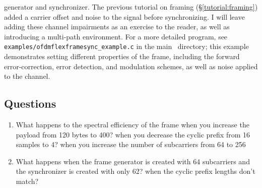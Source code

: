 generator and synchronizer.
The previous tutorial on framing (\S\ref{tutorial:framing}) added
a carrier offset and noise to the signal before synchronizing.
I will leave adding these channel impairments as an exercise to the
reader, as well as introducing a multi-path environment.
%
For a more detailed program, see {\tt examples/ofdmflexframesync\_example.c}
in the main \liquid\ directory;
this example demonstrates setting different properties of the frame,
including the forward error-correction, error detection, and modulation
schemes,
as well as noise applied to the channel.
%
%

%
%

%
%
\subsection{Questions}
\label{tutorial:ofdmflexframe:questions}

\begin{enumerate}
\item What happens to the spectral efficiency of the frame when you
      increase the payload from 120 bytes to 400?
      when you decrease the cyclic prefix from 16 samples to 4?
      when you increase the number of subcarriers from 64 to 256
\item What happens when the frame generator is created with 64
      subcarriers and the synchronizer is created with only 62?
      when the cyclic prefix lengths don't match?
\end{enumerate}
